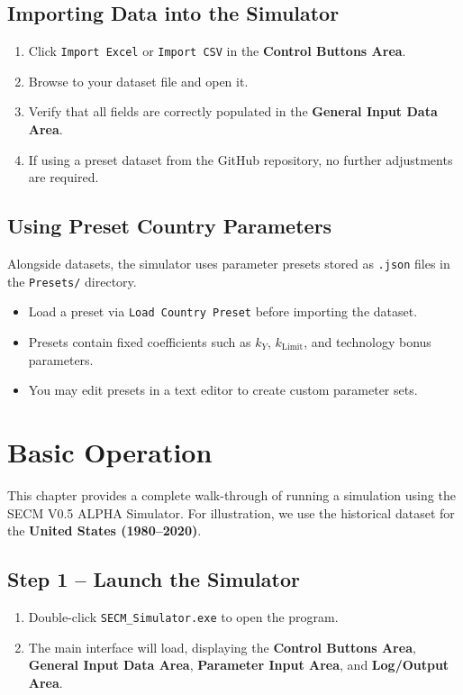 \documentclass[12pt,a4paper]{article}
\begin{document}
\subsection{Importing Data into the Simulator}
\begin{enumerate}
    \item Click \texttt{Import Excel} or \texttt{Import CSV} in the \textbf{Control Buttons Area}.
    \item Browse to your dataset file and open it.
    \item Verify that all fields are correctly populated in the \textbf{General Input Data Area}.
    \item If using a preset dataset from the GitHub repository, no further adjustments are required.
\end{enumerate}

\subsection{Using Preset Country Parameters}
Alongside datasets, the simulator uses parameter presets stored as \texttt{.json} files in the \texttt{Presets/} directory.
\begin{itemize}
    \item Load a preset via \texttt{Load Country Preset} before importing the dataset.
    \item Presets contain fixed coefficients such as \(k_Y\), \(k_{\text{Limit}}\), and technology bonus parameters.
    \item You may edit presets in a text editor to create custom parameter sets.
\end{itemize}

\newpage
\section{Basic Operation}

This chapter provides a complete walk-through of running a simulation using the SECM V0.5 ALPHA Simulator.  
For illustration, we use the historical dataset for the \textbf{United States (1980–2020)}.

\subsection{Step 1 – Launch the Simulator}
\begin{enumerate}
    \item Double-click \texttt{SECM\_Simulator.exe} to open the program.
    \item The main interface will load, displaying the \textbf{Control Buttons Area}, \textbf{General Input Data Area}, \textbf{Parameter Input Area}, and \textbf{Log/Output Area}.
\end{enumerate}
\end{document}
